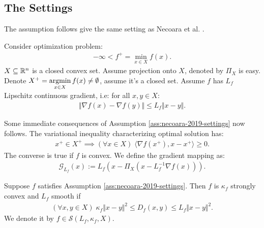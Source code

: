 \documentclass[12pt]{report}
\begin{document}
        \subsection{The Settings}
            The assumption follows give the same setting as Necoara et al. \cite{necoara_linear_2019}. 
            \begin{assumption}\label{ass:necoara-2019-settings}
                Consider optimization problem: 
                \begin{align}
                    -\infty < f^+ = \min_{x \in X} f(x) . 
                \end{align}\label{problem:necoara-2019}
                $X\subseteq \mathbb R^n$ is a closed convex set. 
                Assume projection onto $X$, denoted by $\Pi_X$ is easy. 
                Denote $X^+ = \mathop{\rm argmin}\limits_{x \in X}f(x) \neq \emptyset$, assume it's a closed set. 
                Assume $f$ has $L_f$ Lipschitz continuous gradient, i.e: for all $x, y\in X$: 
                \begin{align*}
                    \Vert \nabla f(x) - \nabla f(y)\Vert \le L_f\Vert x - y\Vert. 
                \end{align*}
            \end{assumption}
            Some immediate consequences of Assumption \ref{ass:necoara-2019-settings} now follows. 
            The variational inequality characterizing optimal solution has: 
            \begin{align}\label{ineq:pg-opt-cond}
                x^+ \in X^+ \implies 
                (\forall x \in X)\; \langle \nabla f(x^+), x - x^+\rangle \ge 0. 
            \end{align}
            The converse is true if $f$ is convex. 
            We define the gradient mapping as: 
            \begin{align*}
                \mathcal G_{L_f}(x) := L_f(x - \Pi_{X}(x - L^{-1}_f \nabla f(x))). 
            \end{align*}
            \begin{theorem}\label{thm:breg-div-scnvx}
                Suppose $f$ satisfies Assumption \ref{ass:necoara-2019-settings}. 
                Then $f$ is $\kappa_f$ strongly convex and $L_f$ smooth if
                \begin{align*}
                    (\forall x, y\in X)\; 
                    \kappa_f \Vert x - y\Vert^2 \le 
                    D_f(x, y) \le L_f \Vert x - y\Vert^2. 
                \end{align*}
                We denote it by $f \in \mathcal S(L_f, \kappa_f, X)$. 
            \end{theorem}
\end{document}
